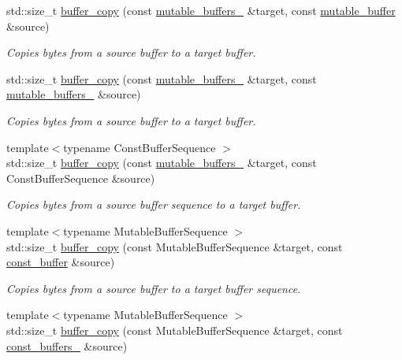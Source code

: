 \begin{DoxyCompactItemize}
std\+::size\+\_\+t \hyperlink{group__buffer__copy_gad90d26f875c173b7a76b133f43b42820}{buffer\+\_\+copy} (const \hyperlink{classasio_1_1mutable__buffers__1}{mutable\+\_\+buffers\+\_} \&target, const \hyperlink{classasio_1_1mutable__buffer}{mutable\+\_\+buffer} \&source)
\begin{DoxyCompactList}\small\item\em Copies bytes from a source buffer to a target buffer. \end{DoxyCompactList}\item 
std\+::size\+\_\+t \hyperlink{group__buffer__copy_gaae1f69957daad37a92d711b3d6f3d474}{buffer\+\_\+copy} (const \hyperlink{classasio_1_1mutable__buffers__1}{mutable\+\_\+buffers\+\_} \&target, const \hyperlink{classasio_1_1mutable__buffers__1}{mutable\+\_\+buffers\+\_} \&source)
\begin{DoxyCompactList}\small\item\em Copies bytes from a source buffer to a target buffer. \end{DoxyCompactList}\item 
{\footnotesize template$<$typename Const\+Buffer\+Sequence $>$ }\\std\+::size\+\_\+t \hyperlink{group__buffer__copy_gaf4a2817b703dafb592312891de669218}{buffer\+\_\+copy} (const \hyperlink{classasio_1_1mutable__buffers__1}{mutable\+\_\+buffers\+\_} \&target, const Const\+Buffer\+Sequence \&source)
\begin{DoxyCompactList}\small\item\em Copies bytes from a source buffer sequence to a target buffer. \end{DoxyCompactList}\item 
{\footnotesize template$<$typename Mutable\+Buffer\+Sequence $>$ }\\std\+::size\+\_\+t \hyperlink{group__buffer__copy_ga53ec05b1cae10cdc08b8768bd6b7b7b2}{buffer\+\_\+copy} (const Mutable\+Buffer\+Sequence \&target, const \hyperlink{classasio_1_1const__buffer}{const\+\_\+buffer} \&source)
\begin{DoxyCompactList}\small\item\em Copies bytes from a source buffer to a target buffer sequence. \end{DoxyCompactList}\item 
{\footnotesize template$<$typename Mutable\+Buffer\+Sequence $>$ }\\std\+::size\+\_\+t \hyperlink{group__buffer__copy_ga980f80c33ea8e7287819bc1753a92f7b}{buffer\+\_\+copy} (const Mutable\+Buffer\+Sequence \&target, const \hyperlink{classasio_1_1const__buffers__1}{const\+\_\+buffers\+\_} \&source)

\end{DoxyCompactItemize}
